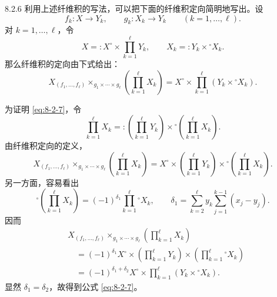 \begin{remark}{8.2.6}\label{rem:8-2-6}
利用上述纤维积的写法，可以把下面的纤维积定向简明地写出。设
\[
 f_k\colon X\longrightarrow Y_k,
 \qquad g_k\colon X_k\longrightarrow Y_k
 \qquad(k=1,\ldots,\ell).
\]
对 $k=1,\ldots,\ell$，令
\[
 X=:X^\circ\times\prod_{k=1}^{\ell}Y_k,
 \qquad
 X_k=:Y_k\times{}^\circ X_k.
\]
那么纤维积的定向由下式给出：
\begin{equation}
 X_{(f_1,\ldots,f_\ell)}\!\times_{g_1\times\cdots\times g_\ell}
 \left(\prod_{k=1}^{\ell}X_k\right)
 =X^\circ\times\prod_{k=1}^{\ell}(Y_k\times{}^\circ X_k).
 \tag{8.2.7}\label{eq:8-2-7}
\end{equation}

为证明 \eqref{eq:8-2-7}，令
\[
 \prod_{k=1}^{\ell}X_k
 =:\left(\prod_{k=1}^{\ell}Y_k\right)
 \times{}^\circ\left(\prod_{k=1}^{\ell}X_k\right).
\]
由纤维积定向的定义，
\[
 X_{(f_1,\ldots,f_\ell)}\!\times_{g_1\times\cdots\times g_\ell}
 \left(\prod_{k=1}^{\ell}X_k\right)
 =X^\circ\times\left(\prod_{k=1}^{\ell}Y_k\right)
 \times{}^\circ\left(\prod_{k=1}^{\ell}X_k\right).
\]
另一方面，容易看出
\[
 {}^\circ\left(\prod_{k=1}^{\ell}X_k\right)
 =(-1)^{\delta_1}\prod_{k=1}^{\ell}{}^\circ X_k,
 \qquad
 \delta_1=\sum_{k=2}^{\ell}y_k
 \sum_{j=1}^{k-1}(x_j-y_j).
\]
因而
\[
\begin{aligned}
 &X_{(f_1,\ldots,f_\ell)}\!\times_{g_1\times\cdots\times g_\ell}
 \left(\prod_{k=1}^{\ell}X_k\right)\\
 &\quad=(-1)^{\delta_1}X^\circ
 \times\left(\prod_{k=1}^{\ell}Y_k\right)
 \times\left(\prod_{k=1}^{\ell}{}^\circ X_k\right)\\
 &\quad=(-1)^{\delta_1+\delta_2}X^\circ
 \times\prod_{k=1}^{\ell}(Y_k\times{}^\circ X_k).
\end{aligned}
\]
显然 $\delta_1=\delta_2$，故得到公式 \eqref{eq:8-2-7}。
\end{remark}
